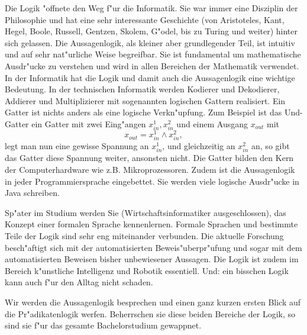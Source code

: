Die Logik "offnete den Weg f"ur die Informatik. Sie war immer eine Disziplin der Philosophie und hat eine sehr interessante Geschichte (von Aristoteles, Kant, Hegel, Boole, Russell, Gentzen, Skolem, G"odel, bis zu Turing und weiter) hinter sich gelassen. Die Aussagenlogik, als kleiner aber grundlegender Teil, ist intuitiv und auf sehr nat"urliche Weise begreifbar. Sie ist fundamental um mathematische Ausdr"ucke zu verstehen und wird in allen Bereichen der Mathematik verwendet. In der Informatik hat die Logik und damit auch die Aussagenlogik eine wichtige Bedeutung. In der technischen Informatik werden Kodierer und Dekodierer, Addierer und Multiplizierer mit sogenannten logischen Gattern realisiert. Ein Gatter ist nichts anders als eine logische Verkn"upfung. Zum Beispiel ist das Und-Gatter ein Gatter mit zwei Eing"angen $x_{in}^1, x_{in}^2$ und einem Ausgang $x_{out}$ mit 
\begin{equation*}
	x_{out} = x_{in}^1 \land x_{in}^2,
\end{equation*}
legt man nun eine gewisse Spannung an $x_{in}^1$, und gleichzeitig an $x_{in}^2$ an, so gibt das Gatter diese Spannung weiter, ansonsten nicht. Die Gatter bilden den Kern der Computerhardware wie z.B. Mikroprozessoren. Zudem ist die Aussagenlogik in jeder Programmiersprache eingebettet. Sie werden viele logische Ausdr"ucke in Java schreiben.

Sp"ater im Studium werden Sie (Wirtschaftsinformatiker ausgeschlossen), das Konzept einer formalen Sprache kennenlernen. Formale Sprachen und bestimmte Teile der Logik sind sehr eng miteinander verbunden. Die aktuelle Forschung besch"aftigt sich mit der automatisierten Beweis"uberpr"ufung und sogar mit dem automatisierten Beweisen bisher unbewiesener Aussagen. Die Logik ist zudem im Bereich k"unstliche Intelligenz und Robotik essentiell. Und: ein bisschen Logik kann auch f"ur den Alltag nicht schaden.

Wir werden die Aussagenlogik besprechen und einen ganz kurzen ersten Blick auf die Pr"adikatenlogik werfen. Beherrschen sie diese beiden Bereiche der Logik, so sind sie f"ur das gesamte Bachelorstudium gewappnet.


